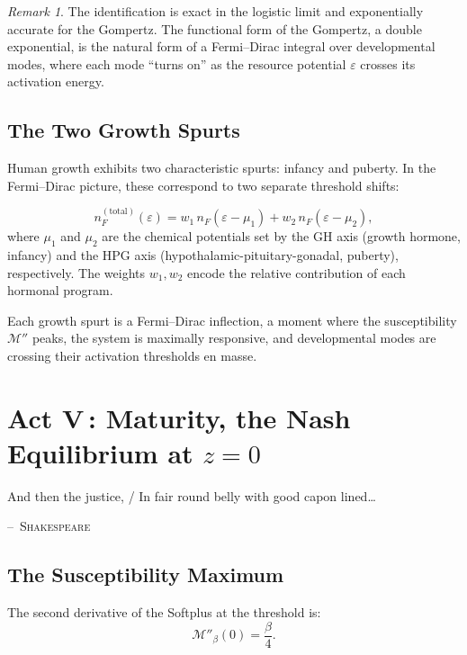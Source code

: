 \documentclass[12pt, letterpaper]{article}
\theoremstyle{plain}
\theoremstyle{definition}
\theoremstyle{remark}
\newtheorem{remark}[theorem]{Remark}
\newcommand{\Mop}{\mathcal{M}}            %
\newcommand{\nF}{n_{\!F}}                 %
\begin{document}
\begin{remark}
  The identification is exact in the logistic limit and exponentially accurate for the Gompertz. The functional form of the Gompertz, a double exponential, is the natural form of a Fermi--Dirac integral over developmental modes, where each mode ``turns on'' as the resource potential $\varepsilon$ crosses its activation energy.
\end{remark}

\subsection{The Two Growth Spurts}

Human growth exhibits two characteristic spurts: infancy and puberty. In the Fermi--Dirac picture, these correspond to two separate threshold shifts:

\begin{equation}\label{eq:bimodal}
  \nF^{(\text{total})}(\varepsilon) = w_1\,\nF(\varepsilon - \mu_1)
    + w_2\,\nF(\varepsilon - \mu_2),
\end{equation}
where $\mu_1$ and $\mu_2$ are the chemical potentials set by the GH axis (growth hormone, infancy) and the HPG axis (hypothalamic-pituitary-gonadal, puberty), respectively. The weights $w_1, w_2$ encode the relative contribution of each hormonal program.

Each growth spurt is a Fermi--Dirac inflection, a moment where the susceptibility $\Mop''$ peaks, the system is maximally responsive, and developmental modes are crossing their activation thresholds en masse.


\section{Act V\,: Maturity, the Nash Equilibrium at \texorpdfstring{$z = 0$}{z=0}}
\label{sec:act5}

\epigraph{And then the justice, / In fair round belly with good capon lined\ldots}{\textsc{--~Shakespeare}}

\subsection{The Susceptibility Maximum}

The second derivative of the Softplus at the threshold is:
\begin{equation}\label{eq:susceptibility}
  \Mop''_\beta(0) = \frac{\beta}{4}.
\end{equation}
\end{document}
